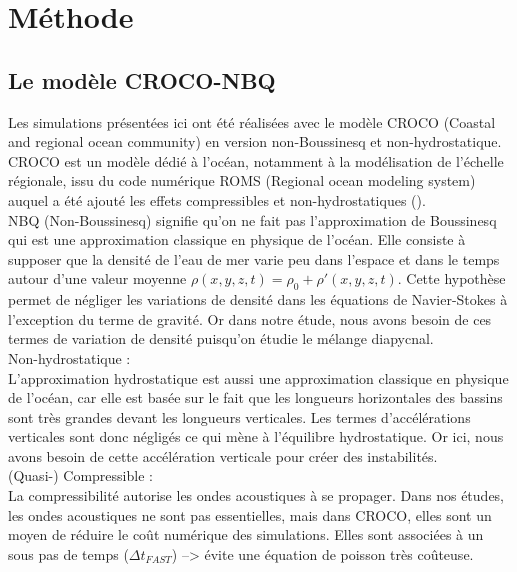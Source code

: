 \documentclass[a4paper,12pt]{article}
\begin{document}
\newpage
\section{Méthode}

    \subsection{Le modèle CROCO-NBQ}
    
    Les simulations présentées ici ont été réalisées avec le modèle CROCO (Coastal and regional ocean community) en version non-Boussinesq et non-hydrostatique.
    CROCO est un modèle dédié à l'océan, notamment à la modélisation de l'échelle régionale, issu du code numérique ROMS (Regional ocean modeling system) auquel a été ajouté les effets compressibles et non-hydrostatiques (\citep{auclair_non-hydrostatic_2018}). \\
    \newline
    NBQ (Non-Boussinesq) signifie qu'on ne fait pas l'approximation de Boussinesq qui est une approximation classique en physique de l'océan. Elle consiste à supposer que la densité de l'eau de mer varie peu dans l'espace et dans le temps autour d'une valeur moyenne $\rho(x,y,z,t)=\rho_{0}+\rho'(x,y,z,t)$. Cette hypothèse permet de négliger les variations de densité dans les équations de Navier-Stokes à l'exception du terme de gravité. Or dans notre étude, nous avons besoin de ces termes de variation de densité puisqu'on étudie le mélange diapycnal. \\
    \newline
    Non-hydrostatique :\\
    L'approximation hydrostatique est aussi une approximation classique en physique de l'océan, car elle est basée sur le fait que les longueurs horizontales des bassins sont très grandes devant les longueurs verticales. Les termes d'accélérations verticales sont donc négligés ce qui mène à l'équilibre hydrostatique. Or ici, nous avons besoin de cette accélération verticale pour créer des instabilités. \\
    \newline
    (Quasi-) Compressible :\\ 
    La compressibilité autorise les ondes acoustiques à se propager. Dans nos études, les ondes acoustiques ne sont pas essentielles, mais dans CROCO, elles sont un moyen de réduire le coût numérique des simulations. Elles sont associées à un sous pas de temps ($\Delta t_{FAST}$) --> évite une équation de poisson très coûteuse. \\
\end{document}
